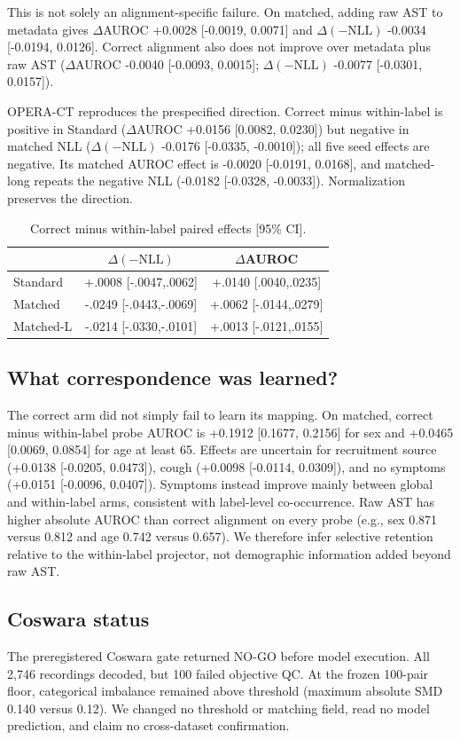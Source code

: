 \documentclass{article}
\newcommand{\deltanll}{\Delta(-\mathrm{NLL})}
\begin{document}
This is not solely an alignment-specific failure. On matched, adding raw AST to metadata
gives $\Delta$AUROC +0.0028 [-0.0019, 0.0071] and $\deltanll$ -0.0034 [-0.0194, 0.0126].
Correct alignment also does not improve over metadata plus raw AST
($\Delta$AUROC -0.0040 [-0.0093, 0.0015]; $\deltanll$ -0.0077 [-0.0301, 0.0157]).

OPERA-CT reproduces the prespecified direction. Correct minus within-label is positive in
Standard ($\Delta$AUROC +0.0156 [0.0082, 0.0230]) but negative in matched NLL
($\deltanll$ -0.0176 [-0.0335, -0.0010]); all five seed effects are negative. Its matched
AUROC effect is -0.0020 [-0.0191, 0.0168], and matched-long repeats the negative NLL
(-0.0182 [-0.0328, -0.0033]). Normalization preserves the direction.

\begin{table}[t]
\centering
\caption{Correct minus within-label paired effects [95\% CI].}
\label{tab:paired}
\setlength{\tabcolsep}{3.2pt}
\begin{tabular}{lcc}
\toprule
 & $\deltanll$ & $\Delta$AUROC \\
\midrule
Standard & +.0008 [-.0047,.0062] & +.0140 [.0040,.0235] \\
Matched & -.0249 [-.0443,-.0069] & +.0062 [-.0144,.0279] \\
Matched-L & -.0214 [-.0330,-.0101] & +.0013 [-.0121,.0155] \\
\bottomrule
\end{tabular}
\end{table}

\subsection{What correspondence was learned?}
The correct arm did not simply fail to learn its mapping. On matched, correct minus
within-label probe AUROC is +0.1912 [0.1677, 0.2156] for sex and +0.0465 [0.0069, 0.0854]
for age at least 65. Effects are uncertain for recruitment source (+0.0138 [-0.0205,
0.0473]), cough (+0.0098 [-0.0114, 0.0309]), and no symptoms (+0.0151 [-0.0096, 0.0407]).
Symptoms instead improve mainly between global and within-label arms, consistent with
label-level co-occurrence. Raw AST has higher absolute AUROC than correct alignment on
every probe (e.g., sex 0.871 versus 0.812 and age 0.742 versus 0.657). We therefore infer
selective retention relative to the within-label projector, not demographic information
added beyond raw AST.

\subsection{Coswara status}
The preregistered Coswara gate returned NO-GO before model execution. All 2,746 recordings
decoded, but 100 failed objective QC. At the frozen 100-pair floor, categorical imbalance
remained above threshold (maximum absolute SMD 0.140 versus 0.12). We changed no threshold
or matching field, read no model prediction, and claim no cross-dataset confirmation.
\end{document}
